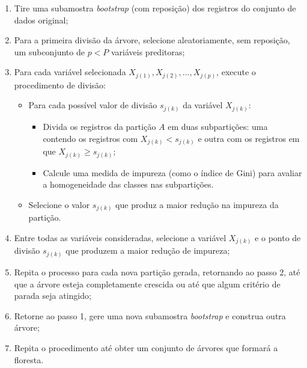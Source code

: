 \documentclass{article}
\begin{document}
\begin{enumerate}
    \item Tire uma subamostra \textit{bootstrap} (com reposição) dos registros
    do conjunto de dados original;

    \item Para a primeira divisão da árvore, selecione aleatoriamente, sem
    reposição, um subconjunto de $p < P$ variáveis preditoras;

    \item Para cada variável selecionada 
    $X_{j(1)}, X_{j(2)}, \dots, X_{j(p)}$, execute o procedimento de divisão:

    \begin{itemize}
        \item Para cada possível valor de divisão $s_{j(k)}$ da variável 
        $X_{j(k)}$:

        \begin{itemize}
            \item Divida os registros da partição $A$ em duas subpartições:
            uma contendo os registros com $X_{j(k)} < s_{j(k)}$ e outra com
            os registros em que $X_{j(k)} \ge s_{j(k)}$;

            \item Calcule uma medida de impureza (como o índice de Gini) para
            avaliar a homogeneidade das classes nas subpartições.
        \end{itemize}

        \item Selecione o valor $s_{j(k)}$ que produz a maior redução na
        impureza da partição.
    \end{itemize}

    \item Entre todas as variáveis consideradas, selecione a variável 
    $X_{j(k)}$ e o ponto de divisão $s_{j(k)}$ que produzem a maior redução
    de impureza;

    \item Repita o processo para cada nova partição gerada, retornando ao
    passo 2, até que a árvore esteja completamente crescida ou até que
    algum critério de parada seja atingido;

    \item Retorne ao passo 1, gere uma nova subamostra \textit{bootstrap} e
    construa outra árvore;

    \item Repita o procedimento até obter um conjunto de árvores que formará
    a floresta.
\end{enumerate}
\end{document}
